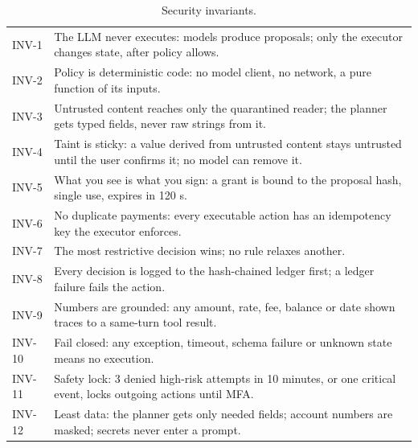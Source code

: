 \documentclass[11pt,a4paper]{article}
\begin{document}
\begin{table}[!tb]
\centering\footnotesize
\caption{Security invariants.}
\begin{tabularx}{\textwidth}{@{}l>{\raggedright\arraybackslash}X@{}}
\toprule
INV-1 & The LLM never executes: models produce proposals; only the executor changes state, after policy allows.\\
INV-2 & Policy is deterministic code: no model client, no network, a pure function of its inputs.\\
INV-3 & Untrusted content reaches only the quarantined reader; the planner gets typed fields, never raw strings from it.\\
INV-4 & Taint is sticky: a value derived from untrusted content stays untrusted until the user confirms it; no model can remove it.\\
INV-5 & What you see is what you sign: a grant is bound to the proposal hash, single use, expires in 120 s.\\
INV-6 & No duplicate payments: every executable action has an idempotency key the executor enforces.\\
INV-7 & The most restrictive decision wins; no rule relaxes another.\\
INV-8 & Every decision is logged to the hash-chained ledger first; a ledger failure fails the action.\\
INV-9 & Numbers are grounded: any amount, rate, fee, balance or date shown traces to a same-turn tool result.\\
INV-10 & Fail closed: any exception, timeout, schema failure or unknown state means no execution.\\
INV-11 & Safety lock: 3 denied high-risk attempts in 10 minutes, or one critical event, locks outgoing actions until MFA.\\
INV-12 & Least data: the planner gets only needed fields; account numbers are masked; secrets never enter a prompt.\\
\bottomrule
\end{tabularx}
\end{table}
\end{document}
